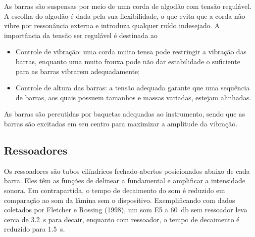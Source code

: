 \documentclass{article}
\begin{document}
As barras são suspensas por meio de uma corda de algodão com tensão regulável. A escolha do algodão é dada pela sua flexibilidade, o que evita que a corda não vibre por ressonância externa e introduza qualquer ruído indesejado. A importância da tensão ser regulável é destinada ao

\begin{itemize}
  \item Controle de vibração: uma corda muito tensa pode restringir a vibração das barras, enquanto uma muito frouxa pode não dar estabilidade o suficiente para as barras vibrarem adequadamente;
  \item Controle de altura das barras: a tensão adequada garante que uma sequência de barras, aos quais possuem tamanhos e massas variadas, estejam alinhadas.
\end{itemize}

As barras são percutidas por baquetas adequadas ao instrumento, sendo que as barras são excitadas em seu centro para maximizar a amplitude da vibração.

\subsection{Ressoadores}

Os ressoadores são tubos cilíndricos fechado-abertos posicionados abaixo de cada barra. Eles têm as funções de delinear a fundamental e amplificar a intensidade sonora. Em contrapartida, o tempo de decaimento do som é reduzido em comparação ao som da lâmina sem o dispositivo. Exemplificando com dados coletados por Fletcher e Rossing (1998), um som E5 a \SI{60}{\decibel} sem ressoador leva cerca de \SI{3.2}{\second} para decair, enquanto com ressoador, o tempo de decaimento é reduzido para \SI{1.5}{\second}.
\end{document}

